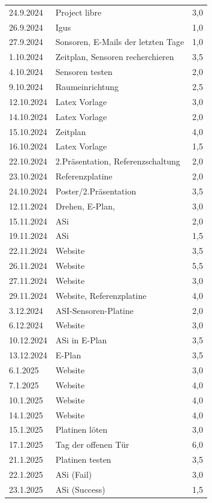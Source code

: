 \begin{longtable}{|l|p{10cm}|r|}
    24.9.2024	&	Project libre	&	3,0	\\
    26.9.2024	&	Igus	&	1,0	\\
    27.9.2024	&	Sonsoren, E-Mails der letzten Tage	&	1,0	\\
    1.10.2024	&	Zeitplan, Sensoren recherchieren	&	3,5	\\
    4.10.2024	&	Sensoren testen	&	2,0	\\
    9.10.2024	&	Raumeinrichtung	&	2,5	\\
    12.10.2024	&	Latex Vorlage	&	3,0	\\
    14.10.2024	&	Latex Vorlage	&	2,0	\\
    15.10.2024	&	Zeitplan	&	4,0	\\
    16.10.2024	&	Latex Vorlage	&	1,5	\\
    22.10.2024	&	2.Präsentation, Referenzschaltung	&	2,0	\\
    23.10.2024	&	Referenzplatine	&	2,0	\\
    24.10.2024	&	Poster/2.Präsentation	&	3,5	\\
    12.11.2024	&	Drehen, E-Plan, 	&	3,0	\\
    15.11.2024	&	ASi	&	2,0	\\
    19.11.2024	&	ASi	&	1,5	\\
    22.11.2024	&	Website	&	3,5	\\
    26.11.2024	&	Website	&	5,5	\\
    27.11.2024	&	Website	&	3,0	\\
    29.11.2024	&	Website, Referenzplatine	&	4,0	\\
    3.12.2024	&	ASI-Sensoren-Platine	&	2,0	\\
    6.12.2024	&	Website	&	3,0	\\
    10.12.2024	&	ASi in E-Plan	&	3,5	\\
    13.12.2024	&	E-Plan 	&	3,5	\\
    6.1.2025	&	Website	&	3,0	\\
    7.1.2025	&	Website	&	4,0	\\
    10.1.2025	&	Website	&	4,0	\\
    14.1.2025	&	Website	&	4,0	\\
    15.1.2025	&	Platinen löten	&	3,0	\\
    17.1.2025	&	Tag der offenen Tür	&	6,0	\\
    21.1.2025	&	Platinen testen	&	3,5	\\
    22.1.2025	&	ASi (Fail)	&	3,0	\\
    23.1.2025	&	ASi (Success)	&	1,5	\\

\end{longtable}
